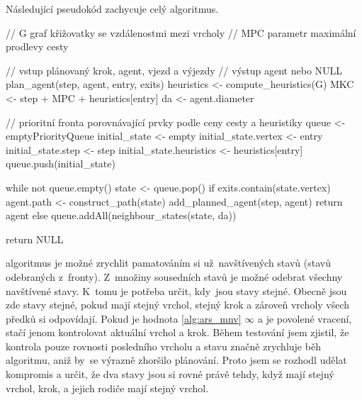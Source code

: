 Následující pseudokód zachycuje celý  algoritmus.

\begin{code}[fontsize=\footnotesize]
// G graf křižovatky se vzdálenostmi mezi vrcholy
// MPC parametr maximální prodlevy cesty

// vstup plánovaný krok, agent, vjezd a výjezdy
// výstup agent nebo NULL
plan_agent(step, agent, entry, exits)
  heuristics <- compute_heuristics(G)
  MKC <- step + MPC + heuristics[entry]
  da <- agent.diameter

  // prioritní fronta porovnávající prvky podle ceny cesty a heuristiky
  queue <- emptyPriorityQueue
  initial_state <- empty
  initial_state.vertex <- entry
  initial_state.step <- step
  initial_state.heuristics <- heuristics[entry]
  queue.push(initial_state)

  while not queue.empty()
    state <- queue.pop()
    if exits.contain(state.vertex)
      agent.path <- construct_path(state)
      add_planned_agent(step, agent)
      return agent
    else
      queue.addAll(neighbour_states(state, da))

  return NULL
\end{code}


 algoritmus je možné zrychlit pamatováním si už~navštívených stavů (stavů odebraných z~fronty).
Z~množiny sousedních stavů je možné odebrat všechny navštívené stavy.
K~tomu je potřeba určit, kdy~jsou stavy stejné.
Obecně jsou zde stavy stejné, pokud mají stejný vrchol, stejný krok a zároveň vrcholy všech předků si odpovídají.
Pokud je hodnota \ref{alg:ars_mnv} $\infty$ a je povolené vracení, stačí jenom kontrolovat aktuální vrchol a krok.
Během testování jsem zjistil, že kontrola pouze rovnosti posledního vrcholu a stavu značně zrychluje běh algoritmu,
aniž by~se výrazně zhoršilo plánování.
Proto jsem se rozhodl udělat kompromis a určit, že dva stavy jsou si rovné právě tehdy,
když mají stejný vrchol, krok, a jejich rodiče mají stejný vrchol.
